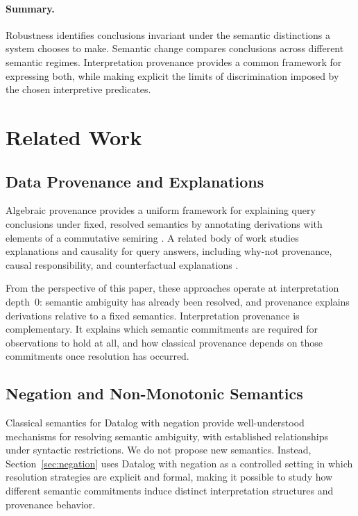 \documentclass[acmsmall,nonacm]{acmart}
\theoremstyle{remark}
\numberwithin{definition}{section}
\numberwithin{theorem}{section}
\numberwithin{lemma}{section}
\numberwithin{corollary}{section}
\numberwithin{remark}{section}
\numberwithin{example}{section}
\numberwithin{observation}{section}
\numberwithin{assumption}{section}
\begin{document}
\paragraph{Summary.}
Robustness identifies conclusions invariant under the semantic distinctions a
system chooses to make.
Semantic change compares conclusions across different semantic regimes.
Interpretation provenance provides a common framework for expressing both, while
making explicit the limits of discrimination imposed by the chosen interpretive
predicates.

\section{Related Work}
\label{sec:related}

\subsection{Data Provenance and Explanations}

Algebraic provenance provides a uniform framework for explaining query
conclusions under fixed, resolved semantics by annotating derivations with
elements of a commutative semiring
\cite{green2007provenance,suciu2011probabilistic,dalvi2012probabilistic,olteanu2015factorized,senellart2018provenance}.
A related body of work studies explanations and causality for query answers,
including why-not provenance, causal responsibility, and counterfactual
explanations
\cite{buneman2001why,halpern2001causes,meliou2010causality,glavic2015survey}.

From the perspective of this paper, these approaches operate at
interpretation depth~0: semantic ambiguity has already been resolved, and
provenance explains derivations relative to a fixed semantics.
Interpretation provenance is complementary.
It explains which semantic commitments are required for observations to hold
at all, and how classical provenance depends on those commitments once
resolution has occurred.

\subsection{Negation and Non-Monotonic Semantics}

Classical semantics for Datalog with negation provide well-understood mechanisms
for resolving semantic ambiguity, with established relationships under syntactic
restrictions.
We do not propose new semantics.
Instead, Section~\ref{sec:negation} uses Datalog with negation as a controlled
setting in which resolution strategies are explicit and formal, making it
possible to study how different semantic commitments induce distinct
interpretation structures and provenance behavior.
\end{document}
